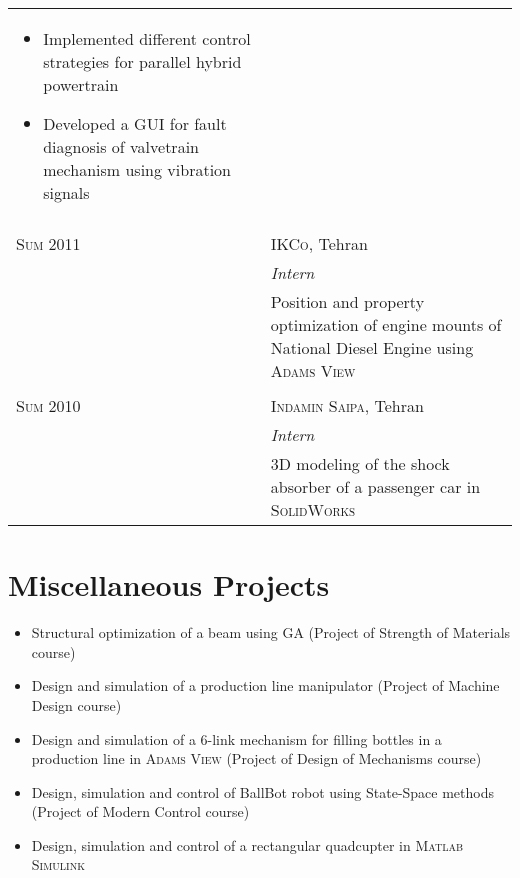 \documentclass[a4paper,9pt]{article}
\begin{document}
\begin{longtable}{p{1.7cm}|p{13.3cm}}
\begin{itemize}[leftmargin=*]
 \item{\footnotesize{Implemented different control strategies for parallel hybrid powertrain}}
 
 \item{\footnotesize{Developed a GUI for fault diagnosis of valvetrain mechanism using vibration signals}}
 
\end{itemize}\\
 
\multicolumn{2}{c}{} \\
 
 


\textsc{Sum 2011} & \textsc{IKCo}, Tehran\\
&\emph{Intern}\\
&\footnotesize{Position and property optimization of engine mounts of National Diesel Engine using \textsc{Adams View}}\\
\multicolumn{2}{c}{}\\

\textsc{Sum 2010} & \textsc{Indamin Saipa}, Tehran\\
&\emph{Intern}\\
&\footnotesize{3D modeling of the shock absorber of a passenger car in \textsc{SolidWorks}}
\end{longtable}


\section*{Miscellaneous Projects}

\begin{itemize}

\item  Structural optimization of a beam using GA (Project of Strength of Materials course)

\item  Design and simulation of a production line manipulator (Project of Machine Design course)


\item  Design and simulation of a 6-link mechanism for filling bottles in a production line in \textsc{Adams View} (Project of Design of Mechanisms course)

\item  Design, simulation and control of BallBot robot using State-Space methods (Project of Modern Control course)

\item  Design, simulation and control of a rectangular quadcupter in \textsc{Matlab Simulink}

\end{itemize}
\end{document}
